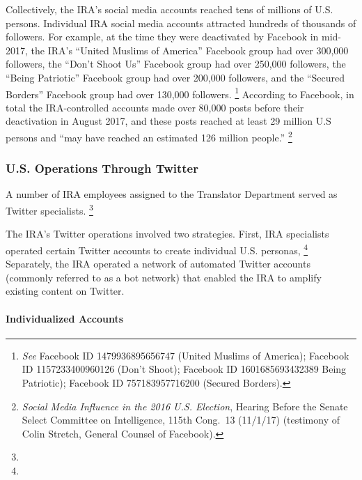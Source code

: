Collectively, the IRA's social media accounts reached tens of millions of U.S. persons.
Individual IRA social media accounts attracted hundreds of thousands of followers.
For example, at the time they were deactivated by Facebook in mid-2017, the IRA's ``United Muslims of America'' Facebook group had over 300,000 followers, the ``Don't Shoot Us'' Facebook group had over 250,000 followers, the ``Being Patriotic'' Facebook group had over 200,000 followers, and the ``Secured Borders'' Facebook group had over 130,000 followers.%
\footnote{\textit{See} Facebook ID 1479936895656747 (United Muslims of America);
Facebook ID 1157233400960126 (Don't Shoot);
Facebook ID 1601685693432389 Being Patriotic);
Facebook ID 757183957716200 (Secured Borders).


}
According to Facebook, in total the IRA-controlled accounts made over 80,000 posts before their deactivation in August 2017, and these posts reached at least 29 million U.S persons and ``may have reached an estimated 126 million people.''%
\footnote{\textit{Social Media Influence in the 2016 U.S. Election}, Hearing Before the Senate Select Committee on Intelligence, 115th Cong.~13 (11/1/17) (testimony of Colin Stretch, General Counsel of Facebook).}

\subsubsection{U.S. Operations Through Twitter}

A number of IRA employees assigned to the Translator Department served as Twitter specialists.
\footnote{}

The IRA's Twitter operations involved two strategies.
First, IRA specialists operated certain Twitter accounts to create individual U.S. personas, %
\footnote{}
Separately, the IRA operated a network of automated Twitter accounts (commonly referred to as a bot network) that enabled the IRA to amplify existing content on Twitter.

\paragraph{Individualized Accounts}

